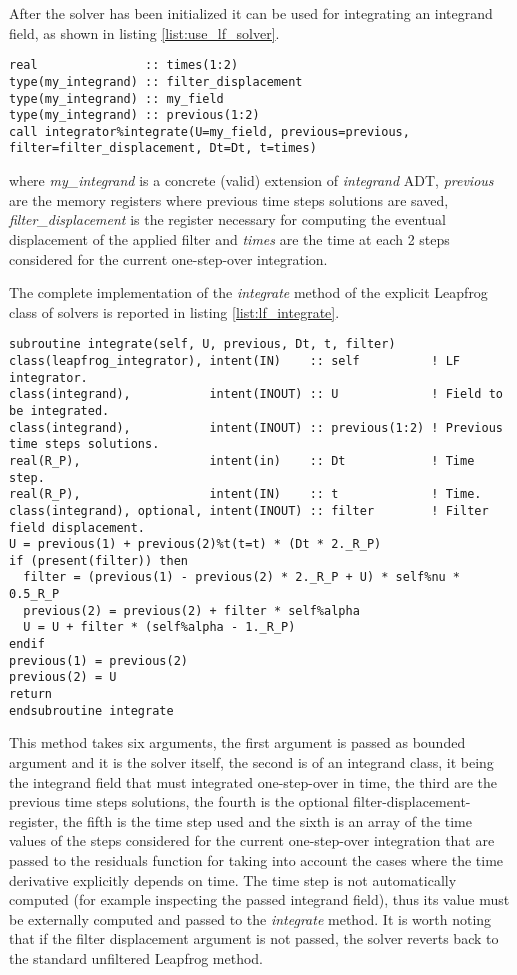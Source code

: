 \documentclass[pdftex,preprint,3p,times,numbers]{elsarticle}
\begin{document}
After the solver has been initialized it can be used for integrating an integrand field, as shown in listing \ref{list:use_lf_solver}.

\begin{lstlisting}[firstnumber=1,style=code,caption={example of usage of a Leapfrog integrator},label={list:use_lf_solver}]
real               :: times(1:2)
type(my_integrand) :: filter_displacement
type(my_integrand) :: my_field
type(my_integrand) :: previous(1:2)
call integrator%integrate(U=my_field, previous=previous, filter=filter_displacement, Dt=Dt, t=times)
\end{lstlisting}
where \emph{my\_integrand} is a concrete (valid) extension of \emph{integrand} ADT, \emph{previous} are the memory registers where previous time steps solutions are saved, \emph{filter\_displacement} is the register necessary for computing the eventual displacement of the applied filter and \emph{times} are the time at each 2 steps considered for the current one-step-over integration.

The complete implementation of the \emph{integrate} method of the explicit Leapfrog class of solvers is reported in listing \ref{list:lf_integrate}.

\begin{lstlisting}[firstnumber=1,style=code,caption={implementation of the \emph{integrate} method of explicit Leapfrog class},label={list:lf_integrate}]
subroutine integrate(self, U, previous, Dt, t, filter)
class(leapfrog_integrator), intent(IN)    :: self          ! LF integrator.
class(integrand),           intent(INOUT) :: U             ! Field to be integrated.
class(integrand),           intent(INOUT) :: previous(1:2) ! Previous time steps solutions.
real(R_P),                  intent(in)    :: Dt            ! Time step.
real(R_P),                  intent(IN)    :: t             ! Time.
class(integrand), optional, intent(INOUT) :: filter        ! Filter field displacement.
U = previous(1) + previous(2)%t(t=t) * (Dt * 2._R_P)
if (present(filter)) then
  filter = (previous(1) - previous(2) * 2._R_P + U) * self%nu * 0.5_R_P
  previous(2) = previous(2) + filter * self%alpha
  U = U + filter * (self%alpha - 1._R_P)
endif
previous(1) = previous(2)
previous(2) = U
return
endsubroutine integrate
\end{lstlisting}

This method takes six arguments, the first argument is passed as bounded argument and it is the solver itself, the second is of an integrand class, it being the integrand field that must integrated one-step-over in time, the third are the previous time steps solutions, the fourth is the optional filter-displacement-register, the fifth is the time step used and the sixth is an array of the time values of the steps considered for the current one-step-over integration that are passed to the residuals function for taking into account the cases where the time derivative explicitly depends on time. The time step is not automatically computed (for example inspecting the passed integrand field), thus its value must be externally computed and passed to the \emph{integrate} method. It is worth noting that if the filter displacement argument is not passed, the solver reverts back to the standard unfiltered Leapfrog method.
\end{document}
